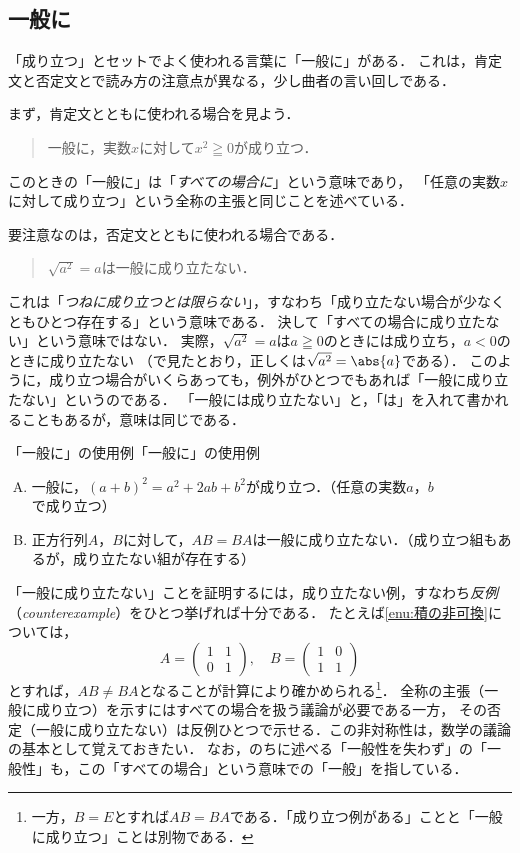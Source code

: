\subsection{一般に}

「成り立つ」とセットでよく使われる言葉に「一般に」がある．
これは，肯定文と否定文とで読み方の注意点が異なる，少し曲者の言い回しである．

まず，肯定文とともに使われる場合を見よう．
\begin{quote}
  一般に，実数$x$に対して$x^2 \geqq 0$が成り立つ．
\end{quote}
このときの「一般に」は「\emph{すべての場合に}」という意味であり，
「任意の実数$x$に対して成り立つ」という全称の主張と同じことを述べている．

要注意なのは，否定文とともに使われる場合である．
\begin{quote}
  $\sqrt{a^2} = a$は一般に成り立たない．
\end{quote}
これは「\emph{つねに成り立つとは限らない}」，すなわち「成り立たない場合が少なくともひとつ存在する」という意味である．
決して「すべての場合に成り立たない」という意味ではない．
実際，$\sqrt{a^2}=a$は$a \geqq 0$のときには成り立ち，$a < 0$のときに成り立たない
（で見たとおり，正しくは$\sqrt{a^2}=\abs{a}$である）．
このように，成り立つ場合がいくらあっても，例外がひとつでもあれば「一般に成り立たない」というのである．
「一般には成り立たない」と，「は」を入れて書かれることもあるが，意味は同じである．

\begin{example}{「一般に」の使用例}{「一般に」の使用例}
  \begin{enumerate}[(A)]
    \item 一般に，$(a+b)^2 = a^2 + 2ab + b^2$が成り立つ．（任意の実数$a$，$b$で成り立つ）
    \item 正方行列$A$，$B$に対して，$AB=BA$は一般に成り立たない．（成り立つ組もあるが，成り立たない組が存在する）\label{enu:積の非可換}
  \end{enumerate}
\end{example}

「一般に成り立たない」ことを証明するには，成り立たない例，すなわち\emph{反例}（\emph{counterexample}）をひとつ挙げれば十分である．
たとえば\ref{enu:積の非可換}については，
\[
  A=\begin{pmatrix} 1 & 1 \\ 0 & 1 \end{pmatrix},\quad
  B=\begin{pmatrix} 1 & 0 \\ 1 & 1 \end{pmatrix}
\]
とすれば，$AB \ne BA$となることが計算により確かめられる\footnote{一方，$B=E$とすれば$AB=BA$である．「成り立つ例がある」ことと「一般に成り立つ」ことは別物である．}．
全称の主張（一般に成り立つ）を示すにはすべての場合を扱う議論が必要である一方，
その否定（一般に成り立たない）は反例ひとつで示せる．この非対称性は，数学の議論の基本として覚えておきたい．
なお，のちに述べる「一般性を失わず」の「一般性」も，この「すべての場合」という意味での「一般」を指している．

